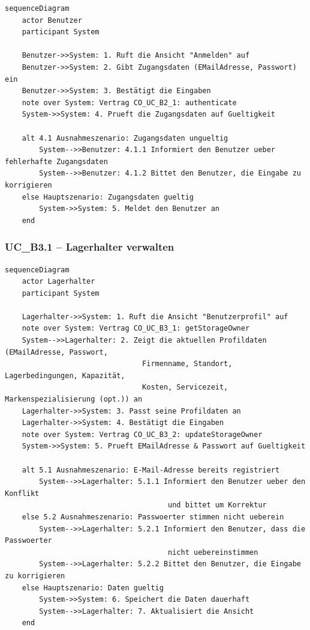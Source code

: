 \begin{lstlisting}[basicstyle=\ttfamily\small, breaklines=true]
sequenceDiagram
    actor Benutzer
    participant System

    Benutzer->>System: 1. Ruft die Ansicht "Anmelden" auf
    Benutzer->>System: 2. Gibt Zugangsdaten (EMailAdresse, Passwort) ein
    Benutzer->>System: 3. Bestätigt die Eingaben
    note over System: Vertrag CO_UC_B2_1: authenticate
    System->>System: 4. Prueft die Zugangsdaten auf Gueltigkeit

    alt 4.1 Ausnahmeszenario: Zugangsdaten ungueltig
        System-->>Benutzer: 4.1.1 Informiert den Benutzer ueber fehlerhafte Zugangsdaten
        System-->>Benutzer: 4.1.2 Bittet den Benutzer, die Eingabe zu korrigieren
    else Hauptszenario: Zugangsdaten gueltig
        System->>System: 5. Meldet den Benutzer an
    end
\end{lstlisting}

\newpage

{}
\subsubsection*{UC\_B3.1 – Lagerhalter verwalten}

\begin{lstlisting}[basicstyle=\ttfamily\small, breaklines=true]
sequenceDiagram
    actor Lagerhalter
    participant System

    Lagerhalter->>System: 1. Ruft die Ansicht "Benutzerprofil" auf
    note over System: Vertrag CO_UC_B3_1: getStorageOwner
    System-->>Lagerhalter: 2. Zeigt die aktuellen Profildaten (EMailAdresse, Passwort,
                                Firmenname, Standort, Lagerbedingungen, Kapazität,
                                Kosten, Servicezeit, Markenspezialisierung (opt.)) an
    Lagerhalter->>System: 3. Passt seine Profildaten an
    Lagerhalter->>System: 4. Bestätigt die Eingaben
    note over System: Vertrag CO_UC_B3_2: updateStorageOwner
    System->>System: 5. Prueft EMailAdresse & Passwort auf Gueltigkeit

    alt 5.1 Ausnahmeszenario: E-Mail-Adresse bereits registriert
        System-->>Lagerhalter: 5.1.1 Informiert den Benutzer ueber den Konflikt
                                      und bittet um Korrektur
    else 5.2 Ausnahmeszenario: Passwoerter stimmen nicht ueberein
        System-->>Lagerhalter: 5.2.1 Informiert den Benutzer, dass die Passwoerter
                                      nicht uebereinstimmen
        System-->>Lagerhalter: 5.2.2 Bittet den Benutzer, die Eingabe zu korrigieren
    else Hauptszenario: Daten gueltig
        System->>System: 6. Speichert die Daten dauerhaft
        System-->>Lagerhalter: 7. Aktualisiert die Ansicht
    end
\end{lstlisting}

